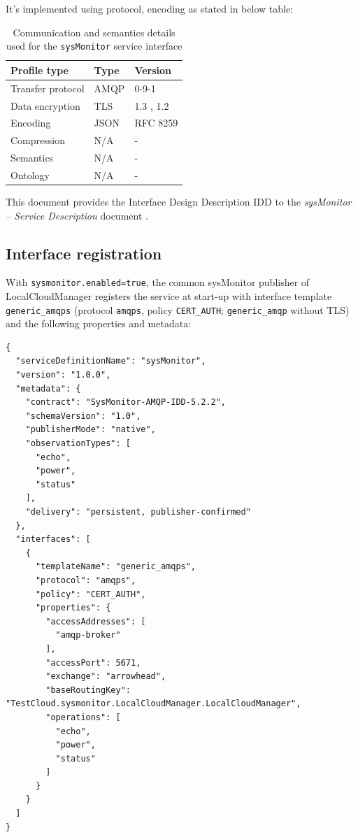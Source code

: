 \documentclass[a4paper]{arrowhead}
\begin{document}
It's implemented using protocol, encoding as stated in below table:
\begin{table}[ht!]
  \centering
  \begin{tabular}{|l|l|l|}
    \hline
    \rowcolor{gray!33} Profile type & Type & Version \\ \hline
    Transfer protocol & AMQP & 0-9-1 \cite{amqp091} \\ \hline
    Data encryption & TLS & 1.3 \cite{rfc8446}, 1.2 \cite{rfc5246} \\ \hline
    Encoding & JSON & RFC 8259 \cite{rfc8259} \\ \hline
    Compression & N/A & - \\ \hline
    Semantics & N/A & - \\ \hline
    Ontology & N/A & - \\ \hline
  \end{tabular}
  \caption{Communication and semantics details used for the \texttt{sysMonitor} service interface}
  \label{tab:comunication_semantics_profile}
\end{table}

This document provides the Interface Design Description IDD to the \textit{sysMonitor -- Service Description} document \cite{lcm-sysMonitor-sd}.

\subsection{Interface registration}

With \texttt{sysmonitor.enabled=true}, the common sysMonitor publisher of LocalCloudManager registers the service at start-up with interface template \texttt{generic\_\allowbreak{}amqps} (protocol \texttt{amqps}, policy \texttt{CERT\_\allowbreak{}AUTH}; \texttt{generic\_\allowbreak{}amqp} without TLS) and the following properties and metadata:

\begin{lstlisting}[caption={Registered service instance (TestCloud).}]
{
  "serviceDefinitionName": "sysMonitor",
  "version": "1.0.0",
  "metadata": {
    "contract": "SysMonitor-AMQP-IDD-5.2.2",
    "schemaVersion": "1.0",
    "publisherMode": "native",
    "observationTypes": [
      "echo",
      "power",
      "status"
    ],
    "delivery": "persistent, publisher-confirmed"
  },
  "interfaces": [
    {
      "templateName": "generic_amqps",
      "protocol": "amqps",
      "policy": "CERT_AUTH",
      "properties": {
        "accessAddresses": [
          "amqp-broker"
        ],
        "accessPort": 5671,
        "exchange": "arrowhead",
        "baseRoutingKey": "TestCloud.sysmonitor.LocalCloudManager.LocalCloudManager",
        "operations": [
          "echo",
          "power",
          "status"
        ]
      }
    }
  ]
}
\end{lstlisting}
\end{document}
